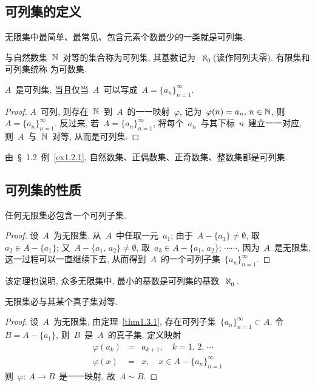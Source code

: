 \subsection{可列集的定义}

无限集中最简单、最常见、包含元素个数最少的一类就是可列集.

\begin{definition}
与自然数集~$\mathbb{N}$~对等的集合称为可列集,
其基数记为~$\aleph_0$(读作阿列夫零). 有限集和可列集统称
为可数集.
\end{definition}

\begin{remark}
$A$~是可列集, 当且仅当~$A$~可以写成~$A = \{a_n\}_{n = 1} ^\infty$.
\end{remark}

\begin{proof}
$A$~可列, 则存在~$\mathbb{N}$~到~$A$~的一一映射~$\varphi$, 记为~$\varphi(n) = a_n, \, n \in \mathbb{N}$, 则~$A = \{a_n\}_{n = 1} ^\infty$. 反过来, 若~$A = \{a_n\}_{n = 1} ^\infty$, 将每个~$a_n$~与其下标~$n$~建立一一对应, 则~$A$~与~$\mathbb{N}$~对等, 从而是可列集.
\end{proof}

由~\S~1.2~例~\ref{ex1.2.1}, 自然数集、正偶数集、正奇数集、整数集都是可列集.

\subsection{可列集的性质}

\begin{proposition} \label{thm1.3.1}
任何无限集必包含一个可列子集.
\end{proposition}

\begin{proof}
设~$A$~为无限集. 从~$A$~中任取一元~$a_1$; 由于~$A - \{a_1\} \neq \emptyset$, 取~$a_2 \in A - \{a_1\}$; 又~$A - \{a_1, \, a_2\} \neq \emptyset$, 取~$a_3 \in A - \{a_1, \, a_2\}$; $\cdots\cdots$,  因为~$A$~是无限集, 这一过程可以一直继续下去, 从而得到~$A$~的一个可列子集~$\{a_n\}_{n = 1} ^\infty$.
\end{proof}

该定理也说明, 众多无限集中, 最小的基数是可列集的基数~$\aleph_0$.

\begin{corollary} \label{cor1.3.1}
无限集必与其某个真子集对等.
\end{corollary}

\begin{proof}
设~$A$~为无限集, 由定理~\ref{thm1.3.1}, 存在可列子集~$\{a_n\}_{n = 1} ^\infty \subset A$. 令~$B = A - \{a_1\}$, 则~$B$~是~$A$~的真子集. 定义映射
\begin{eqnarray*}
\varphi(a_k) &=& a_{k+1}, \quad k = 1, \, 2, \, \cdots \\
\varphi(x) &=& x, \quad x \in A - \{a_n\}_{n = 1} ^\infty
\end{eqnarray*}
则~$\varphi: \: A \rightarrow B$~是一一映射, 故~$A \sim B$.
\end{proof}

